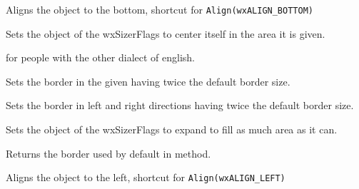 
Aligns the object to the bottom, shortcut for \texttt{Align(wxALIGN\_BOTTOM)}




\label{wxsizerflagscenter}


Sets the object of the wxSizerFlags to center itself in the area it is given.


\label{wxsizerflagscentre}


 for people with the other dialect of english.


\label{wxsizerflagsdoubleborder}


Sets the border in the given  having twice the default border
size.


\label{wxsizerflagsdoublehorzborder}


Sets the border in left and right directions having twice the default border
size.


\label{wxsizerflagsexpand}


Sets the object of the wxSizerFlags to expand to fill as much area as it can.


\label{wxsizerflagsgetdefaultborder}


Returns the border used by default in  method.


\label{wxsizerflagsleft}


Aligns the object to the left, shortcut for \texttt{Align(wxALIGN\_LEFT)}


